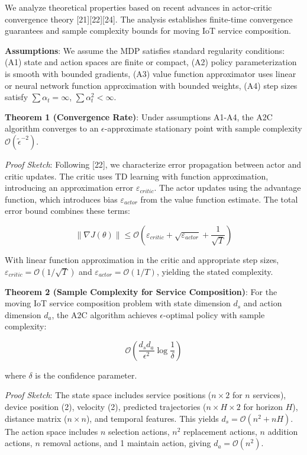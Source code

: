 We analyze theoretical properties based on recent advances in
actor-critic convergence theory {[}21{]}{[}22{]}{[}24{]}. The analysis
establishes finite-time convergence guarantees and sample complexity
bounds for moving IoT service composition.

\textbf{Assumptions}: We assume the MDP satisfies standard regularity
conditions: (A1) state and action spaces are finite or compact, (A2)
policy parameterization is smooth with bounded gradients, (A3) value
function approximator uses linear or neural network function
approximation with bounded weights, (A4) step sizes satisfy
\(\sum \alpha_t = \infty\), \(\sum \alpha_t^2 < \infty\).

\textbf{Theorem 1 (Convergence Rate)}: Under assumptions A1-A4, the A2C
algorithm converges to an \(\epsilon\)-approximate stationary point with
sample complexity \(\mathcal{O}(\tilde{\epsilon}^{-2})\).

\emph{Proof Sketch}: Following {[}22{]}, we characterize error
propagation between actor and critic updates. The critic uses TD
learning with function approximation, introducing an approximation error
\(\varepsilon_{critic}\). The actor updates using the advantage
function, which introduces bias \(\varepsilon_{actor}\) from the value
function estimate. The total error bound combines these terms:

\[\| \nabla J(\theta) \| \leq \mathcal{O}(\varepsilon_{critic} + \sqrt{\varepsilon_{actor}} + \frac{1}{\sqrt{T}})\]

With linear function approximation in the critic and appropriate step
sizes, \(\varepsilon_{critic} = \mathcal{O}(1/\sqrt{T})\) and
\(\varepsilon_{actor} = \mathcal{O}(1/T)\), yielding the stated
complexity.

\textbf{Theorem 2 (Sample Complexity for Service Composition)}: For the
moving IoT service composition problem with state dimension \(d_s\) and
action dimension \(d_a\), the A2C algorithm achieves
\(\epsilon\)-optimal policy with sample complexity:

\[\mathcal{O}\left(\frac{d_s d_a}{\epsilon^2} \log\frac{1}{\delta}\right)\]

where \(\delta\) is the confidence parameter.

\emph{Proof Sketch}: The state space includes service positions
(\(n \times 2\) for \(n\) services), device position (2), velocity (2),
predicted trajectories (\(n \times H \times 2\) for horizon \(H\)),
distance matrix (\(n \times n\)), and temporal features. This yields
\(d_s = \mathcal{O}(n^2 + nH)\). The action space includes \(n\)
selection actions, \(n^2\) replacement actions, \(n\) addition actions,
\(n\) removal actions, and 1 maintain action, giving
\(d_a = \mathcal{O}(n^2)\).

